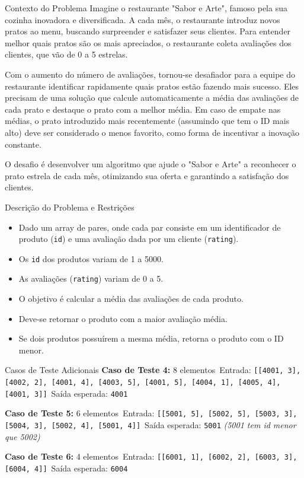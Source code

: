 \begin{frame}[fragile]{Contexto do Problema}
  Imagine o restaurante "Sabor e Arte", famoso pela sua cozinha inovadora e diversificada. A cada mês, o restaurante introduz novos pratos ao menu, buscando surpreender e satisfazer seus clientes. Para entender melhor quais pratos são os mais apreciados, o restaurante coleta avaliações dos clientes, que vão de 0 a 5 estrelas.
  
  Com o aumento do número de avaliações, tornou-se desafiador para a equipe do restaurante identificar rapidamente quais pratos estão fazendo mais sucesso. Eles precisam de uma solução que calcule automaticamente a média das avaliações de cada prato e destaque o prato com a melhor média. Em caso de empate nas médias, o prato introduzido mais recentemente (assumindo que tem o ID mais alto) deve ser considerado o menos favorito, como forma de incentivar a inovação constante.
  
  O desafio é desenvolver um algoritmo que ajude o "Sabor e Arte" a reconhecer o prato estrela de cada mês, otimizando sua oferta e garantindo a satisfação dos clientes.
\end{frame}
    

  \begin{frame}[fragile]{Descrição do Problema e Restrições}
    \begin{itemize}
        \item Dado um array de pares, onde cada par consiste em um identificador de produto (\texttt{id}) e uma avaliação dada por um cliente (\texttt{rating}).
        \item Os \texttt{id} dos produtos variam de 1 a 5000.
        \item As avaliações (\texttt{rating}) variam de 0 a 5.
        \item O objetivo é calcular a média das avaliações de cada produto.
        \item Deve-se retornar o produto com a maior avaliação média.
        \item Se dois produtos possuírem a mesma média, retorna o produto com o ID menor.
    \end{itemize}
\end{frame}

\begin{frame}[fragile]{Casos de Teste Adicionais}
  \textbf{Caso de Teste 4:} 8 elementos\
  Entrada: \texttt{[[4001, 3], [4002, 2], [4001, 4], [4003, 5], [4001, 5], [4004, 1], [4005, 4], [4001, 3]]}\
  Saída esperada: \texttt{4001}
  
  \textbf{Caso de Teste 5:} 6 elementos\
  Entrada: \texttt{[[5001, 5], [5002, 5], [5003, 3], [5004, 3], [5002, 4], [5001, 4]]}\
  Saída esperada: \texttt{5001} \textit{(5001 tem id menor que 5002)}
  
  \textbf{Caso de Teste 6:} 4 elementos\
  Entrada: \texttt{[[6001, 1], [6002, 2], [6003, 3], [6004, 4]]}\
  Saída esperada: \texttt{6004}
  \end{frame}

